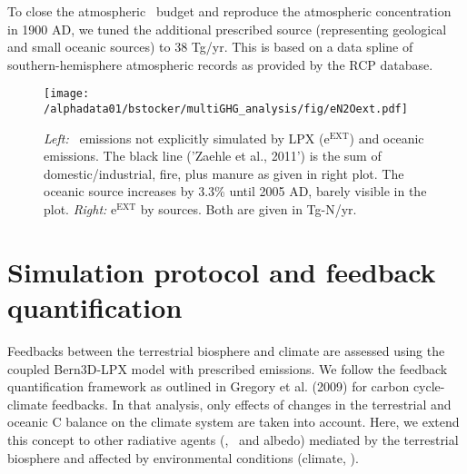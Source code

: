 \documentclass{myreport}
\begin{document}
To close the atmospheric \chh\ budget and reproduce the atmospheric concentration in 1900 AD, we tuned the additional prescribed source (representing geological and small oceanic sources) to 38 Tg\chh /yr. This is based on a data spline of southern-hemisphere atmospheric records as provided by the RCP database\cite{RCPdatabase}.


\begin{figure}[ht!]
\begin{center}
\texttt{[image: /alphadata01/bstocker/multiGHG\_analysis/fig/eN2Oext.pdf]}
\end{center}
\caption{{\it Left:} \nno\ emissions not explicitly simulated by LPX (e\nno $^{\text{EXT}}$) and oceanic emissions. The black line ('Zaehle et al., 2011') is the sum of domestic/industrial, fire, plus manure as given in right plot. The oceanic source increases by 3.3\% until 2005 AD, barely visible in the plot. {\it Right:} e\nno $^{\text{EXT}}$ by sources. Both are given in Tg\nno -N/yr.}
\label{fig:eN2Oext}
\end{figure}

\section{Simulation protocol and feedback quantification}
\label{sec:simulationprotocol}

Feedbacks between the terrestrial biosphere and climate are assessed using the coupled Bern3D-LPX model with prescribed emissions. We follow the feedback quantification framework as outlined in Gregory et al. (2009)\cite{gregory09jclim} for carbon cycle-climate feedbacks. In that analysis, only effects of changes in the terrestrial and oceanic C balance on the climate system are taken into account. Here, we extend this concept to other radiative agents (\chh , \nno\ and albedo) mediated by the terrestrial biosphere and affected by environmental conditions (climate, \coo ).\\

\end{document}
